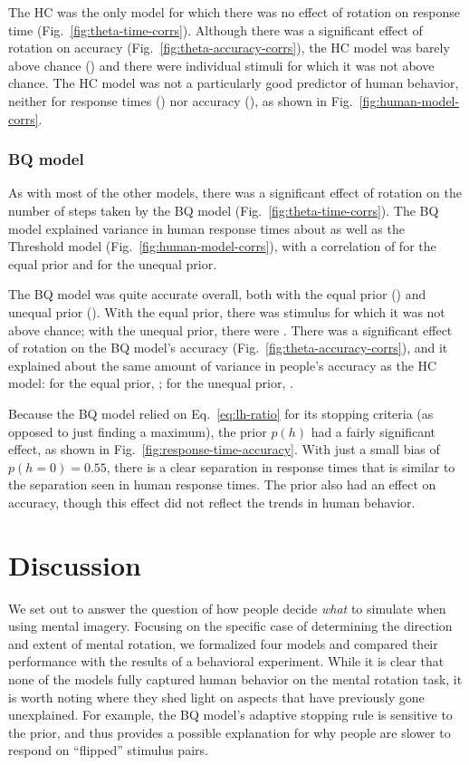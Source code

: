 \documentclass[10pt,letterpaper]{article}
\newcommand{\Th}[0]{Threshold}
\newcommand{\Hc}[0]{HC}
\newcommand{\Bq}[0]{BQ}
\begin{document}
The \Hc{} was the only model for which there was no effect of rotation
on response time (Fig.~\ref{fig:theta-time-corrs}). Although there was
a significant effect of rotation on accuracy
(Fig.~\ref{fig:theta-accuracy-corrs}), the \Hc{} model was barely
above chance (\HcAccuracy{}) and there were \HcNumChance{} individual
stimuli for which it was not above chance. The \Hc{} model was not a
particularly good predictor of human behavior, neither for response
times (\HcTimeCorr{}) nor accuracy (\HcAccuracyCorr{}), as shown in
Fig.~\ref{fig:human-model-corrs}.

\subsubsection{\Bq{} model}

As with most of the other models, there was a significant effect of
rotation on the number of steps taken by the \Bq{} model
(Fig.~\ref{fig:theta-time-corrs}). The \Bq{} model explained variance
in human response times about as well as the \Th{} model
(Fig.~\ref{fig:human-model-corrs}), with a correlation of
\BqTimeCorr{} for the equal prior and \BqpTimeCorr{} for the unequal
prior.  

The \Bq{} model was quite accurate overall, both with the equal prior
(\BqAccuracy{}) and unequal prior (\BqpAccuracy{}). With the equal
prior, there was \BqNumChance{} stimulus for which it was not above
chance; with the unequal prior, there were \BqpNumChance{}. There was
a significant effect of rotation on the \Bq{} model's accuracy
(Fig.~\ref{fig:theta-accuracy-corrs}), and it explained about the same
amount of variance in people's accuracy as the \Hc{} model: for the
equal prior, \BqAccuracyCorr{}; for the unequal prior,
\BqpAccuracyCorr{}.

Because the \Bq{} model relied on Eq.~\ref{eq:lh-ratio} for its
stopping criteria (as opposed to just finding a maximum), the prior
$p(h)$ had a fairly significant effect, as shown in
Fig.~\ref{fig:response-time-accuracy}. With just a small bias of
$p(h=0)=0.55$, there is a clear separation in response times that is
similar to the separation seen in human response times. The prior also
had an effect on accuracy, though this effect did not reflect the
trends in human behavior.

\section{Discussion}

We set out to answer the question of how people decide \textit{what}
to simulate when using mental imagery. Focusing on the specific case
of determining the direction and extent of mental rotation, we
formalized four models and compared their performance with the results
of a behavioral experiment. While it is clear that none of the models
fully captured human behavior on the mental rotation task, it is worth
noting where they shed light on aspects that have previously gone
unexplained.  For example, the \Bq{} model's adaptive stopping rule is
sensitive to the prior, and thus provides a possible explanation for
why people are slower to respond on ``flipped'' stimulus pairs.
\end{document}
